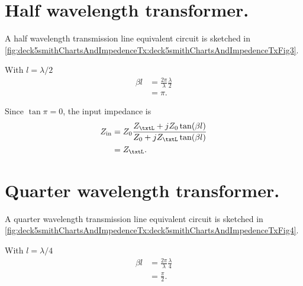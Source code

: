 \section{Half wavelength transformer.}
A half wavelength transmission line equivalent circuit is sketched in \cref{fig:deck5smithChartsAndImpedenceTx:deck5smithChartsAndImpedenceTxFig3}.


With \( l = \lambda/2 \)
\begin{equation}\label{eqn:uwavesDeck5SmithChartCore:180}
\begin{aligned}
\beta l
&= \frac{2 \pi}{\lambda} \frac{\lambda}{2}
\\ &= \pi.
\end{aligned}
\end{equation}

Since \( \tan \pi = 0 \), the input impedance is
\begin{equation}\label{eqn:uwavesDeck5SmithChartCore:200}
\begin{aligned}
Z_{\textrm{in}}
&= Z_0 \frac{ Z_\txtL + j Z_0 \tan(\beta l) }{ Z_0 + j Z_\txtL \tan(\beta l)}
\\ &= Z_\txtL.
\end{aligned}
\end{equation}

\section{Quarter wavelength transformer.}

A quarter wavelength transmission line equivalent circuit is sketched in \cref{fig:deck5smithChartsAndImpedenceTx:deck5smithChartsAndImpedenceTxFig4}.


With \( l = \lambda/4 \)
\begin{equation}\label{eqn:uwavesDeck5SmithChartCore:220}
\begin{aligned}
\beta l
&= \frac{2 \pi}{\lambda} \frac{\lambda}{4}
\\ &= \frac{\pi}{2}.
\end{aligned}
\end{equation}


